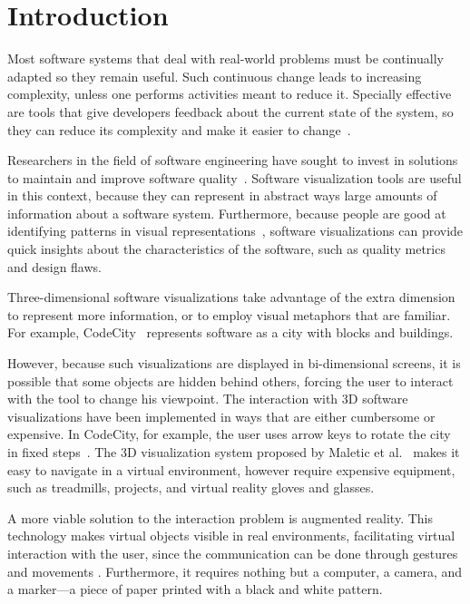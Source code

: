 \section{Introduction} \label{sec:intro}
Most software systems that deal with real-world problems must be continually adapted so they remain useful. Such continuous change leads to increasing complexity, unless one performs activities meant to reduce it. Specially effective are tools that give developers feedback about the current state of the system, so they can reduce its complexity and make it easier to change~\cite{lehman:1980}.

Researchers in the field of software engineering have sought to invest in solutions to maintain and improve software quality~\cite{Sensalire:2008}. Software visualization tools are useful in this context, because they can represent in abstract ways large amounts of information about a software system. Furthermore, because people are good at identifying patterns in visual representations~\cite{diehl:2007}, software visualizations can provide quick insights about the characteristics of the software, such as quality metrics and design flaws.

Three-dimensional software visualizations take advantage of the extra dimension to represent more information, or to employ visual metaphors that are familiar. For example, CodeCity~\cite{wettel:2008} represents software as a city with blocks and buildings.

However, because such visualizations are displayed in bi-dimensional screens, it is possible that some objects are hidden behind others, forcing the user to interact with the tool to change his viewpoint. The interaction with 3D software visualizations have been implemented in ways that are either cumbersome or expensive. In CodeCity, for example, the user uses arrow keys to rotate the city in fixed steps~\cite{wettel:2008}. The 3D visualization system proposed by Maletic et al.~\cite{maletic:2001} makes it easy to navigate in a virtual environment, however require expensive equipment, such as treadmills, projects, and virtual reality gloves and glasses.

A more viable solution to the interaction problem is augmented reality. This technology makes virtual objects visible in real environments, facilitating virtual interaction with the user, since the communication can be done through gestures and movements \cite{azuma:1997}. Furthermore, it requires nothing but a computer, a camera, and a marker---a piece of paper printed with a black and white pattern.

